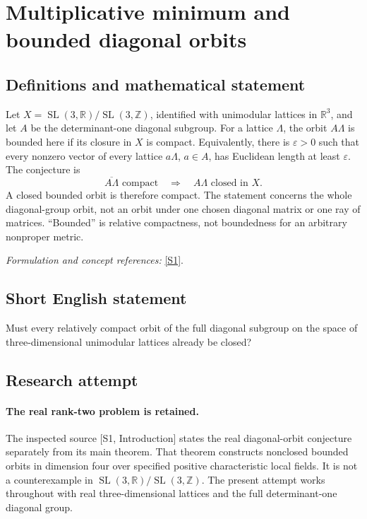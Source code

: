 \documentclass[11pt]{article}
\begin{document}
\section*{\texorpdfstring{Multiplicative minimum and bounded diagonal orbits}{Multiplicative minimum and bounded diagonal orbits}}\label{20003307}
\subsection{Definitions and mathematical statement}
Let $X=\operatorname{SL}(3,{\mathbb{R}})/\operatorname{SL}(3,{\mathbb{Z}})$, identified with unimodular lattices in ${\mathbb{R}}^3$, and let $A$ be the determinant-one diagonal subgroup. For a lattice $\Lambda$, the orbit $A\Lambda$ is bounded here if its closure in $X$ is compact. Equivalently, there is ${\varepsilon}>0$ such that every nonzero vector of every lattice $a\Lambda$, $a\in A$, has Euclidean length at least ${\varepsilon}$. The conjecture is
\[
 \overline{A\Lambda}\text{ compact}\quad\Longrightarrow\quad
 A\Lambda\text{ closed in }X.
\]
A closed bounded orbit is therefore compact. The statement concerns the whole diagonal-group orbit, not an orbit under one chosen diagonal matrix or one ray of matrices. ``Bounded'' is relative compactness, not boundedness for an arbitrary nonproper metric.
\par\smallskip\textit{Formulation and concept references:} \href{https://arxiv.org/html/2504.17644v3}{[S1]}.

\subsection{Short English statement}
Must every relatively compact orbit of the full diagonal subgroup on the space of three-dimensional unimodular lattices already be closed?
\subsection{Research attempt}
\paragraph{The real rank-two problem is retained.}
The inspected source [S1, Introduction] states the real diagonal-orbit
conjecture separately from its main theorem. That theorem constructs
nonclosed bounded orbits in dimension four over specified positive
characteristic local fields. It is not a counterexample in
$\operatorname{SL}(3,\mathbb R)/\operatorname{SL}(3,\mathbb Z)$.
The present attempt works throughout with real three-dimensional
lattices and the full determinant-one diagonal group.
\end{document}
